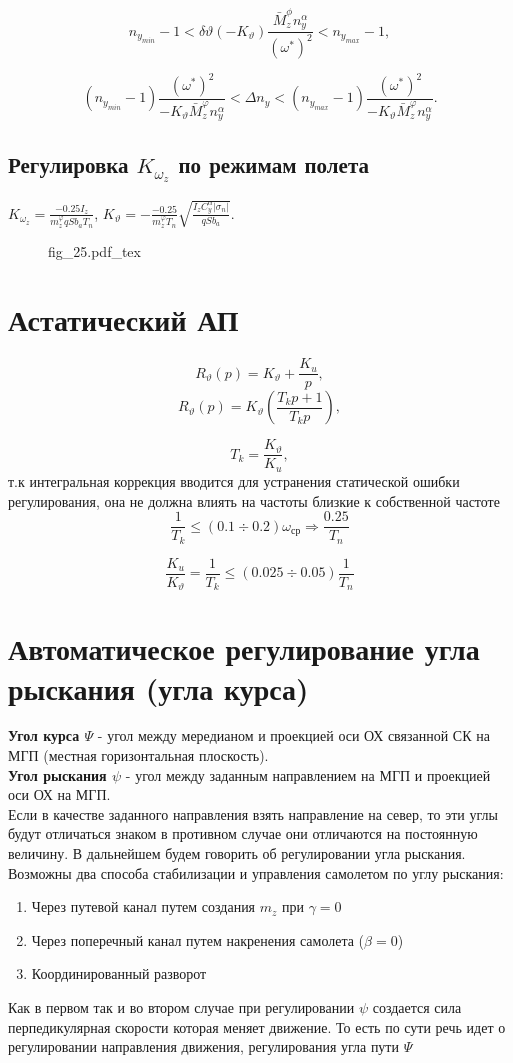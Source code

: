 \documentclass{article}
\begin{document}
\[
n_{{y}_{min}} - 1<  \delta \vartheta (- K_\vartheta)\frac{\bar{M}_z^\phi n_y^\alpha}{(\omega^*)^2} < n_{{y}_{max}} - 1,
\]

\[
(n_{{y}_{min}} - 1)\frac{(\omega^*)^2}{-K_{\vartheta}\bar{M}_z^\varphi n_y^\alpha}< \Delta n_y< (n_{{y}_{max}} - 1) \frac{(\omega^*)^2}{-K_{\vartheta}\bar{M}_z^\varphi n_y^\alpha}.
\]

\subsection{Регулировка $K_{\omega_z}$ по режимам полета}
$K_{\omega_z}  =\frac{-0.25 I_z}{m_z^\varphi q S b_a T_n}$, $K_{\vartheta}  = - \frac{-0.25}{m_z^\varphi T_n} \sqrt{\frac{I_z C_y^\alpha |\sigma_n|}{qSb_a}}$.
\begin{figure}[H]
\centering
{fig_25.pdf_tex}
\end{figure}

\section{Астатический АП}
\[
R_{\vartheta}(p) = K_\vartheta + \frac{K_u}{p},
\]
\[
R_{\vartheta}(p) = K_\vartheta(\frac{T_k p  + 1 }{T_k p}),
\]

\[
T_k = \frac{K_\vartheta}{K_u},
\]
т.к интегральная коррекция вводится для устранения статической ошибки регулирования, она не должна влиять на частоты близкие к собственной частоте 
\[
\frac{1}{T_k} \leq (0.1 \div 0.2) \omega_{ср} \Rightarrow \frac{0.25}{T_n}
\]

\[
\frac{K_u}{K_\vartheta} =  \frac{1}{T_k} \leq (0.025 \div 0.05) \frac{1}{T_n} 
\]
\section{Автоматическое регулирование угла рыскания (угла курса)}
\textbf{Угол курса $\Psi$} - угол между мередианом и проекцией оси ОХ связанной СК на МГП (местная горизонтальная плоскость).\\
\textbf{Угол рыскания $\psi$} - угол между заданным направлением на МГП и проекцией оси ОХ на МГП.\\
Если в качестве заданного направления взять направление на север, то эти углы будут отличаться знаком в противном случае они отличаются на постоянную величину. В дальнейшем будем говорить об регулировании угла рыскания. Возможны два способа стабилизации и управления самолетом по углу рыскания:
\begin{enumerate}
\item Через путевой канал путем создания $m_z$ при $\gamma = 0$
\item Через поперечный канал путем накренения самолета ($\beta = 0$) 
\item Координированный разворот
\end{enumerate}
Как в первом так и во втором случае при регулировании $\psi$ создается сила перпедикулярная скорости которая меняет движение. То есть по сути речь идет о регулировании направления движения, регулирования угла пути $\Psi$
\end{document}
